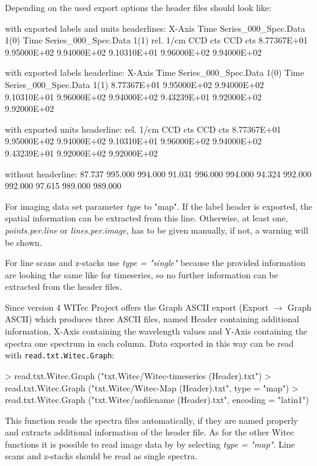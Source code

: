\documentclass[english, a4paper, 10pt, headings=small, DIV11]{scrartcl}
\renewenvironment{Schunk}{\vspace{0pt}\begin{small}}{\end{small}\vspace{0pt}}
\newcommand{\Rfunction}[2][]{\texorpdfstring{\nohyphens{#1\texttt{#2}}}{#2}}
\newcommand{\Rfunarg}[1]{\texorpdfstring{\nohyphens{\textit{#1}}}{#1}}
\begin{document}
Depending on the used export options the header files should look like:
\begin{Schunk}
\begin{Soutput}
with exported labels and units headerlines: 
X-Axis                         Time Series_000_Spec.Data 1(0) Time Series_000_Spec.Data 1(1) 
rel. 1/cm                      CCD cts                        CCD cts                        
 8.77367E+01                    9.95000E+02                    9.94000E+02                   
 9.10310E+01                    9.96000E+02                    9.94000E+02                   

with exported labels headerline: 
X-Axis                         Time Series_000_Spec.Data 1(0) Time Series_000_Spec.Data 1(1) 
 8.77367E+01                    9.95000E+02                    9.94000E+02                   
 9.10310E+01                    9.96000E+02                    9.94000E+02                   
 9.43239E+01                    9.92000E+02                    9.92000E+02                   

with exported units headerline: 
rel. 1/cm    CCD cts      CCD cts      
 8.77367E+01  9.95000E+02  9.94000E+02 
 9.10310E+01  9.96000E+02  9.94000E+02 
 9.43239E+01  9.92000E+02  9.92000E+02 

without headerline: 
 87.737 995.000 994.000 
 91.031 996.000 994.000 
 94.324 992.000 992.000 
 97.615 989.000 989.000 
\end{Soutput}
\end{Schunk}
For imaging data set parameter \Rfunarg{type} to "map". If the label header is exported, the spatial information can be extracted from this line. Otherwise, at least one, \Rfunarg{points.per.line} or \Rfunarg{lines.per.image}, has to be given manually, if not, a warning will be shown.

For line scans and z-stacks use \Rfunarg{type = "single"} because the provided information are looking the same like for timeseries, so no further information can be extracted from the header files.

Since version 4 WITec Project offers the Graph ASCII export (Export $\rightarrow$ Graph ASCII) which produces three ASCII files, named Header containing additional information, X-Axis containing the wavelength values and Y-Axis containing the spectra one spectrum in each column. Data exported in this way can be read with \Rfunction{read.txt.Witec.Graph}:
\begin{Schunk}
\begin{Sinput}
> read.txt.Witec.Graph ("txt.Witec/Witec-timeseries (Header).txt")
> read.txt.Witec.Graph ("txt.Witec/Witec-Map (Header).txt", type = "map")
> read.txt.Witec.Graph ("txt.Witec/nofilename (Header).txt", encoding = "latin1")
\end{Sinput}
\end{Schunk}
This function reads the spectra files automatically, if they are named properly and extracts additional information of the header file. As for the other Witec functions it is possible to read image data by by selecting \Rfunarg{type = "map"}. Line scans and z-stacks should be read as single spectra.
\end{document}
